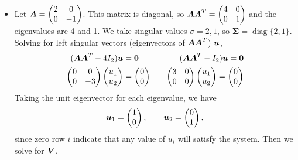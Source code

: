 \documentclass{report}
\DeclareMathOperator{\diag}{diag}
\newcommand{\Sg}{\mathbf{\Sigma}}
\begin{document}
	\sol \begin{itemize}
		\item Let $\boldsymbol{A}=\begin{pmatrix}
		2 & 0 \\ 0 & -1
		\end{pmatrix}$. 
		This matrix is diagonal, so $\boldsymbol{A}\boldsymbol{A}^T=\begin{pmatrix}
		4 & 0 \\ 0 & 1
		\end{pmatrix}$ and the eigenvalues are 4 and 1. We take singular values $\sigma=2,1$, so $\Sg=\diag\{2,1\}$.\\
		Solving for left singular vectors (eigenvectors of $\boldsymbol{A}\boldsymbol{A}^T$) $\boldsymbol{u}$, 
		\begin{align*}
			(\boldsymbol{A}\boldsymbol{A}^T-4I_2)\boldsymbol{u}&=\textbf{0} &(\boldsymbol{A}\boldsymbol{A}^T-I_2)\boldsymbol{u}=\textbf{0}\\
			\begin{pmatrix}
				0 & 0 \\ 0 & -3
			\end{pmatrix}\begin{pmatrix}
			u_1 \\ u_2
			\end{pmatrix}&=\begin{pmatrix}
			0 \\ 0
			\end{pmatrix} &\quad\begin{pmatrix}
			3 & 0 \\ 0 & 0
			\end{pmatrix}\begin{pmatrix}
			u_1 \\ u_2
			\end{pmatrix}=\begin{pmatrix}
			0 \\ 0
			\end{pmatrix}\\
		\end{align*}
		Taking the unit eigenvector for each eigenvalue, we have
		\begin{align*}
			\boldsymbol{u}_1=\begin{pmatrix}
				1 \\ 0
			\end{pmatrix},\quad \quad \boldsymbol{u}_2=\begin{pmatrix}
			0 \\ 1
			\end{pmatrix},
		\end{align*}
		since zero row $i$ indicate that any value of $u_i$ will satisfy the system. Then we solve for $\boldsymbol{V}$,

\end{itemize}
\end{document}
